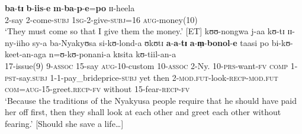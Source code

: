\begin{exe}
\ex \gll \textbf{ba}-\textbf{tɪ} \textbf{b}-\textbf{iis}-\textbf{e} \textbf{m}-\textbf{ba}-\textbf{p}-\textbf{e}=\textbf{po} ɪɪ-heela\\
2-say 2-come-\textsc{subj} \textsc{1sg}-2-give-\textsc{subj}=16 \textsc{aug}-money(10)\\
\glt `They must come so that I give them the money.' [ET]
\ex\label{exSUBJati}
\gll kʊʊ-nongwa j-aa kʊ-tɪ ɪɪ-ny-iiho sy-a ba-Nyakyʊsa si-kʊ-lond-a ʊkʊtɪ \textbf{a}-\textbf{a}-\textbf{tɪ} \textbf{a}-\textbf{m̩}-\textbf{bonol}-\textbf{e} taasi po bi-kʊ-keet-an-aga n=ʊ-kʊ-ponani-a kɪsita kʊ-tiil-an-a\\
17-issue(9) 9-\textsc{assoc} 15-say \textsc{aug}-10-custom 10-\textsc{assoc} 2-Ny. 10-\textsc{prs}-want-\textsc{fv} \textsc{comp} 1-\textsc{pst}-say.\textsc{subj} 1-1-pay\_brideprice-\textsc{subj} yet then 2-\textsc{mod.fut}-look-\textsc{recp}-\textsc{mod.fut} \textsc{com}=\textsc{aug}-15-greet.\textsc{recp}-\textsc{fv} without 15-fear-\textsc{recp}-\textsc{fv}\\
\glt `‎Because the traditions of the Nyakyusa people require that he should have paid her off first, then they shall look at each other and greet each other without fearing.' [Should she save a life\ldots]
\end{exe}


